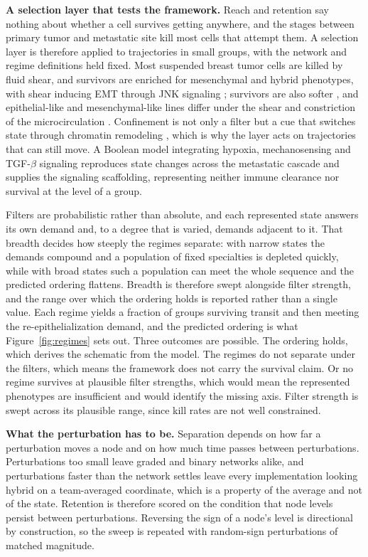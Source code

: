 \documentclass[12pt,letterpaper]{article}
\newcommand{\chg}[1]{\textcolor{chgcolor}{#1}}
\newcommand{\chg}[1]{#1}
\newcommand{\lead}[1]{\textbf{#1}}
\begin{document}
\lead{A selection layer that tests the framework.} Reach and retention say nothing about whether a cell survives getting anywhere, and the stages between primary tumor and metastatic site kill most cells that attempt them. A selection layer is therefore applied to trajectories in small groups, with the network and regime definitions held fixed. Most suspended breast tumor cells are killed by fluid shear, and survivors are enriched for mesenchymal and hybrid phenotypes, with shear inducing EMT through JNK signaling \cite{xin2020}; survivors are also softer \cite{xin2019}, and epithelial-like and mesenchymal-like lines differ under the shear and constriction of the microcirculation \cite{cognart2020}. Confinement is not only a filter but a cue that switches state through chromatin \chg{remodeling} \cite{hunter2025}, which is why the layer acts on trajectories that can still move. A Boolean model integrating hypoxia, mechanosensing and TGF-$\beta$ signaling reproduces state changes across the metastatic cascade \cite{greene2025} and supplies the signaling scaffolding, representing neither immune clearance nor survival at the level of a group.

\chg{Filters are probabilistic rather than absolute, and each represented state answers its own demand and, to a degree that is varied, demands adjacent to it. That breadth decides how steeply the regimes separate: with narrow states the demands compound and a population of fixed specialties is depleted quickly, while with broad states such a population can meet the whole sequence and the predicted ordering flattens. Breadth is therefore swept alongside filter strength, and the range over which the ordering holds is reported rather than a single value.} Each regime yields a fraction of groups surviving transit and then meeting the re-epithelialization demand, and the predicted ordering is what Figure~\ref{fig:regimes} sets out. Three outcomes are possible. The ordering holds, which derives the schematic from the model. The regimes do not separate under the filters, which means the framework does not carry the survival claim. Or no regime survives at plausible filter strengths, which would mean the represented phenotypes are insufficient and would identify the missing axis. Filter strength is swept across its plausible range, since kill rates are not well constrained.

\lead{What the perturbation has to be.} Separation depends on how far a perturbation moves a node and on how much time passes between perturbations. Perturbations too small leave graded and binary networks alike, and perturbations faster than the network settles leave every implementation looking hybrid on a team-averaged coordinate, which is a property of the average and not of the state. Retention is therefore scored on the condition that node levels persist between perturbations. Reversing the sign of a node's level is directional by construction, so the sweep is repeated with random-sign perturbations of matched magnitude.
\end{document}
